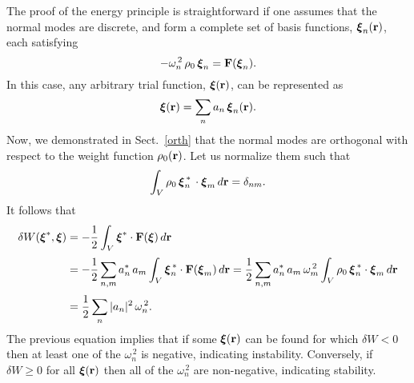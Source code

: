 \documentclass[12pt,prb,aps,notitlepage]{revtex4-1}
\newcommand{\bxi}{\mbox{\boldmath$\xi$}}
\begin{document}
The proof of the energy principle is straightforward if one assumes that the normal modes are discrete, and form a complete set of
basis functions, $\bxi_n({\bf r})$, each satisfying
\begin{equation}
-\omega_n^{\,2}\,\rho_0\,\bxi_n = {\bf F}({\bxi}_n).
\end{equation}
In this case, any arbitrary trial function, $\bxi({\bf r})$, can be represented as
\begin{equation}
\bxi({\bf r}) = \sum_n a_n\,\bxi_n({\bf r}).
\end{equation}
Now, we demonstrated in Sect.~\ref{orth} that the normal modes are orthogonal with respect to the weight function $\rho_0({\bf r})$. Let us
normalize them such that 
\begin{equation}
\int_V \rho_0\,\bxi_n^{\,\ast}\,\cdot\bxi_m\,d{\bf r} = \delta_{nm}.
\end{equation}
It follows that
\begin{align}
\delta W(\bxi^\ast,\bxi) &= -\frac{1}{2}\int_V\bxi^\ast\cdot {\bf F}(\bxi)\,d{\bf r}\nonumber\\[0.5ex]
&= -\frac{1}{2}\sum_{n,m}a_n^{\ast}\,a_m\int_V \bxi_n^{\,\ast}\cdot {\bf F}(\bxi_m)\,d{\bf r}=\frac{1}{2}\sum_{n,m}a_n^{\ast}\,a_m\,\omega_m^{\,2}\int_V \rho_0\,\bxi_n^{\,\ast}\cdot \bxi_m\,d{\bf r}\nonumber\\[0.5ex]
&= \frac{1}{2}\sum_n|a_n|^2\,\omega_n^{\,2}.
\end{align}
The previous equation implies that if some $\bxi({\bf r})$ can be found for which $\delta W <0$ then at least
one of the $\omega_n^{\,2}$ is negative, indicating instability. Conversely, if $\delta W\geq 0$ for all
$\bxi({\bf r})$ then all of the $\omega_n^{\,2}$ are non-negative, indicating stability. 
\end{document}
